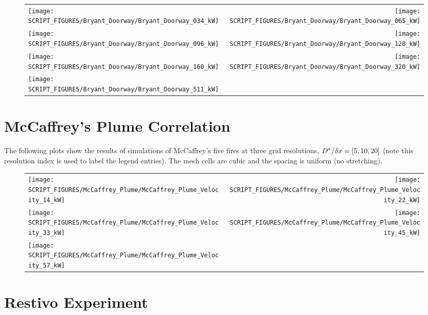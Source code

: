 \begin{figure}[p]
\begin{tabular*}{\textwidth}{l@{\extracolsep{\fill}}r}
\texttt{[image: SCRIPT\_FIGURES/Bryant\_Doorway/Bryant\_Doorway\_034\_kW]} &
\texttt{[image: SCRIPT\_FIGURES/Bryant\_Doorway/Bryant\_Doorway\_065\_kW]} \\
\texttt{[image: SCRIPT\_FIGURES/Bryant\_Doorway/Bryant\_Doorway\_096\_kW]} &
\texttt{[image: SCRIPT\_FIGURES/Bryant\_Doorway/Bryant\_Doorway\_128\_kW]} \\
\texttt{[image: SCRIPT\_FIGURES/Bryant\_Doorway/Bryant\_Doorway\_160\_kW]} &
\texttt{[image: SCRIPT\_FIGURES/Bryant\_Doorway/Bryant\_Doorway\_320\_kW]} \\
\texttt{[image: SCRIPT\_FIGURES/Bryant\_Doorway/Bryant\_Doorway\_511\_kW]} &
\end{tabular*}
\label{Bryant_Doorway}
\end{figure}


\clearpage

\section{McCaffrey's Plume Correlation}

The following plots show the results of simulations of McCaffrey's five fires at three grid resolutions, $D^*/\delta x=[5,10,20]$ (note this resolution index is used to label the legend entries). The mesh cells are cubic and the spacing is uniform (no stretching).

\begin{figure}[h!]
\begin{tabular*}{\textwidth}{l@{\extracolsep{\fill}}r}
\texttt{[image: SCRIPT\_FIGURES/McCaffrey\_Plume/McCaffrey\_Plume\_Velocity\_14\_kW]} &
\texttt{[image: SCRIPT\_FIGURES/McCaffrey\_Plume/McCaffrey\_Plume\_Velocity\_22\_kW]} \\
\texttt{[image: SCRIPT\_FIGURES/McCaffrey\_Plume/McCaffrey\_Plume\_Velocity\_33\_kW]} &
\texttt{[image: SCRIPT\_FIGURES/McCaffrey\_Plume/McCaffrey\_Plume\_Velocity\_45\_kW]} \\
\texttt{[image: SCRIPT\_FIGURES/McCaffrey\_Plume/McCaffrey\_Plume\_Velocity\_57\_kW]} &
\end{tabular*}
\label{McCaffrey_Plume_Velocity}
\end{figure}

\clearpage

\section{Restivo Experiment}

